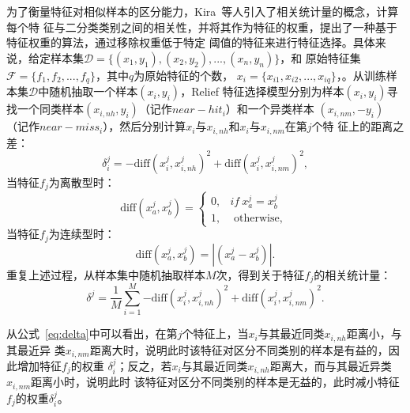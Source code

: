 为了衡量特征对相似样本的区分能力，Kira~\cite{kira1992feature}等人引入了相关统计量的概念，计算每个特
征与二分类类别之间的相关性，并将其作为特征的权重，提出了一种基于特征权重的算法，通过移除权重低于特定
阈值的特征来进行特征选择。具体来说，给定样本集$\mathcal D=\{(x_1,y_1),(x_2,y_2),...,(x_n,y_n)\}$，和
原始特征集$\mathcal F=\{f_1,f_2,...,f_q\}$，其中$q$为原始特征的个数，
$x_i=\{x_{i1},x_{i2},...,x_{iq}\}$，。从训练样本集$\mathcal D$中随机抽取一个样本$(x_i,y_i)$，Relief
特征选择模型分别为样本$(x_i,y_i)$寻找一个同类样本$(x_{i,nh},y_i)$（记作$near-hit_i$）和一个异类样本
$(x_{i,nm},-y_i)$（记作$near-miss_i$），然后分别计算$x_i$与$x_{i,nh}$和$x_i$与$x_{i,nm}$在第$j$个特
征上的距离之差：
\begin{equation}
       \delta^j_i = -\text{diff}(x_i^j, x_{i,nh}^j)^2 + \text{diff}(x_i^j,x_{i,nm}^j)^2, \label{eq:delta}
\end{equation}
当特征$f_j$为离散型时：
\begin{equation}\label{eq:lisan}
       \text{diff}(x^j_a,x^j_b) = \begin{cases} 0, & \textit{if}~x^j_a=x^j_b \\ 
  1, & \text{ otherwise, }  
  \end{cases} 
\end{equation}
当特征$f_j$为连续型时：
\begin{equation}
       \text{diff}(x^j_a,x^j_b) = |(x^j_a-x^j_b)|.
\end{equation}
重复上述过程，从样本集中随机抽取样本$M$次，得到关于特征$f_j$的相关统计量：
\begin{equation}
       \delta^j = \frac{1}{M}\sum_{i=1}^M{-\text{diff}(x_i^j, x_{i,nh}^j)^2 + \text{diff}(x_i^j,x_{i,nm}^j)^2}. \label{eq:Delta}
\end{equation}

从公式~\eqref{eq:delta}中可以看出，在第$j$个特征上，当$x_i$与其最近同类$x_{i,nh}$距离小，与其最近异
类$x_{i,nm}$距离大时，说明此时该特征对区分不同类别的样本是有益的，因此增加特征$f_j$的权重
$\delta^j_i$；反之，若$x_i$与其最近同类$x_{i,nh}$距离大，而与其最近异类$x_{i,nm}$距离小时，说明此时
该特征对区分不同类别的样本是无益的，此时减小特征$f_j$的权重$\delta^j_i$。

